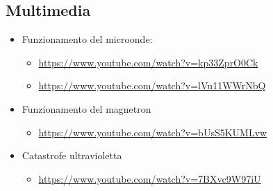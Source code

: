 \documentclass{article}
\begin{document}
\subsection{Multimedia}
\begin{itemize}[noitemsep]
  \item Funzionamento del microonde:
  \begin{itemize}[noitemsep]
   \item \url{https://www.youtube.com/watch?v=kp33ZprO0Ck}
   \item \url{https://www.youtube.com/watch?v=lVu11WWrNbQ} 
  \end{itemize}
  \item Funzionamento del magnetron
\begin{itemize}[noitemsep]
\item \url{https://www.youtube.com/watch?v=bUsS5KUMLvw}
\end{itemize}
  \item Catastrofe ultravioletta 
  
\begin{itemize}[noitemsep]
\item \url{https://www.youtube.com/watch?v=7BXvc9W97iU}
\end{itemize}
\end{itemize}
\begin{quote}

\end{quote}
\end{document}

